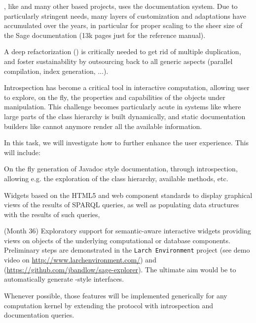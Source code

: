 \begin{workpackage}
\begin{tasklist}
\begin{task}[id=sage-sphinx, title=Refactor \Sage's \Sphinx documentation system, lead=PS,PM=6, partners={SR,UV}, wphases=0-36]
  \Sage, like \Python and many other \Python based projects, uses the
  \Sphinx documentation system. Due to particularly stringent needs,
  many layers of customization and adaptations have accumulated over
  the years, in particular for proper scaling to the sheer size of the
  Sage documentation (13k pages just for the reference manual).

  A deep refactorization () is critically
  needed to get rid of multiple duplication, and foster sustainability
  by outsourcing back to \Sphinx all generic aspects (parallel
  compilation, index generation, ...).
\end{task}

\begin{task}[id=dynamic-inspect,title=Dynamic documentation and exploration system,lead=PS, partners={SR,USO,UV,LL}, PM=6, wphases=0-12]
  Introspection has become a critical tool in interactive computation,
  allowing user to explore, on the fly, the properties and
  capabilities of the objects under manipulation. This challenge
  becomes particularly acute in systems like \Sage where large parts
  of the class hierarchy is built dynamically, and static
  documentation builders like \Sphinx cannot anymore render all the
  available information.

  In this task, we will investigate how to further enhance the user
  experience. This will include:
  \begin{compactitem}
  \item On the fly generation of Javadoc style documentation, through
    introspection, allowing e.g. the exploration of the class
    hierarchy, available methods, etc.
  \item Widgets based on the HTML5 and web component standards to display
    graphical views of the results of SPARQL queries, as well as populating data
    structures with the results of such queries,
  \item {} (Month 36)
    Exploratory support for semantic-aware interactive widgets
    providing views on objects of the underlying computational or
    database components. Preliminary steps are demonstrated in the
    \texttt{Larch Environment} project (see demo video on
    \url{http://www.larchenvironment.com/}) and
    (\url{https://github.com/jbandlow/sage-explorer}). The ultimate
    aim would be to automatically generate \LMFDB-style interfaces.
  \end{compactitem}
  Whenever possible, those features will be implemented generically
  for any computation kernel by extending the \Jupyter protocol with
  introspection and documentation queries.
\end{task}


\end{tasklist}
\end{workpackage}
